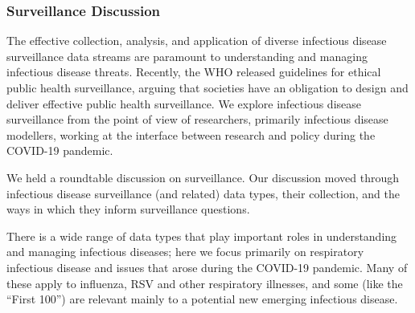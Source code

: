 \subsubsection{Surveillance Discussion}
\label{sec:surv-disc}


The effective collection, analysis, and application of diverse infectious disease surveillance data streams are paramount to understanding and managing infectious disease threats. Recently, the WHO released guidelines for ethical public health surveillance, arguing that societies have an obligation to design and deliver effective public health surveillance. We explore infectious disease surveillance from the point of view of researchers, primarily infectious disease modellers, working at the interface between research and policy during the COVID-19 pandemic.

We held a roundtable discussion on surveillance.
Our discussion moved through infectious disease surveillance (and related) data types, their collection, and the ways in which they inform surveillance questions.


There is a wide range of data types that play important roles in understanding and managing infectious diseases; here we focus primarily on respiratory infectious disease and issues that arose during the COVID-19 pandemic. Many of these apply to influenza, RSV and other respiratory illnesses, and some (like the “First 100”) are relevant mainly to a potential new emerging infectious disease. 

